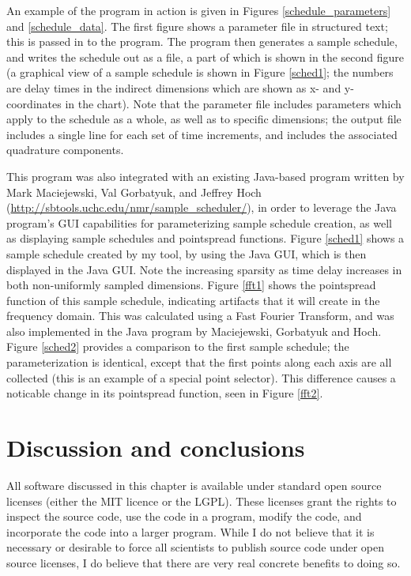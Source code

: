 An example of the program in action is given in Figures \ref{schedule_parameters} 
and \ref{schedule_data}.  The first figure shows a parameter file in structured
text; this is passed in to the program.  The program then generates a sample
schedule, and writes the schedule out as a file, a part of which is shown in
the second figure (a graphical view of a sample schedule is shown in Figure \ref{sched1};
the numbers are delay times in the indirect dimensions which are shown as x- 
and y-coordinates in the chart).  Note that the parameter file includes parameters which 
apply to the schedule as a whole, as well as to specific dimensions; the output
file includes a single line for each set of time increments, and includes the
associated quadrature components.

This program was also integrated with an existing Java-based program written
by Mark Maciejewski, Val Gorbatyuk, and Jeffrey Hoch 
(\url{http://sbtools.uchc.edu/nmr/sample_scheduler/}), in order to leverage
the Java program's GUI capabilities for parameterizing sample schedule creation,
as well as displaying sample schedules and pointspread functions.  
Figure \ref{sched1} shows a sample schedule created by my tool, by using the
Java GUI, which is then displayed in the Java GUI.  Note the increasing
sparsity as time delay increases in both non-uniformly sampled dimensions.
Figure \ref{fft1} shows the pointspread function of this sample schedule,
indicating artifacts that it will create in the frequency domain.  This was 
calculated using a Fast Fourier Transform, and was also implemented in the
Java program by Maciejewski, Gorbatyuk and Hoch.  Figure \ref{sched2} provides
a comparison to the first sample schedule; the parameterization is identical,
except that the first points along each axis are all collected (this is an
example of a special point selector).  This difference causes a noticable 
change in its pointspread function, seen in Figure \ref{fft2}.



\section{Discussion and conclusions}

All software discussed in this chapter is available under standard open source
licenses (either the MIT licence or the LGPL).  These licenses grant the rights
to inspect the source code, use the code in a program, modify the code, and
incorporate the code into a larger program.  While I do not believe that it is
necessary or desirable to force all scientists to publish source code under
open source licenses, I do believe that there are very real concrete benefits
to doing so.  

